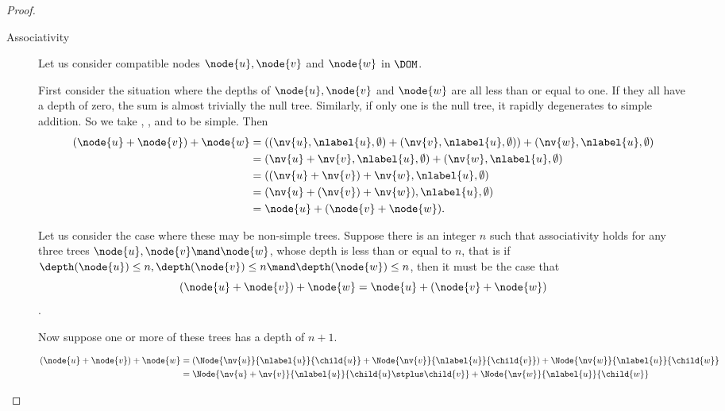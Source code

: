 \begin{proposition}
\begin{proof}
\begin{description}
    \item[Associativity]

      Let us consider compatible nodes \(\node{u}, \node{v}\) and
      \(\node{w}\) in $\DOM$. 

      First consider the situation where the depths of \(\node{u}, \node{v}\) and
      \(\node{w}\) are all less than or equal to one. If they all have
      a depth of zero, the sum is almost trivially the null
      tree. Similarly, if only one is the null tree, it rapidly
      degenerates to simple addition. So we take , ,
      and  to be simple. Then
      \begin{align*}
          (\node{u}+\node{v})+\node{w} &= ((\nv{u}, \nlabel{u}, \emptyset) + (\nv{v}, \nlabel{u}, \emptyset)) + (\nv{w}, \nlabel{u}, \emptyset) \\
          &= (\nv{u} + \nv{v}, \nlabel{u}, \emptyset) + (\nv{w}, \nlabel{u}, \emptyset) \\
          &= ((\nv{u} + \nv{v}) + \nv{w}, \nlabel{u}, \emptyset) \\
          &= (\nv{u} + (\nv{v}) + \nv{w}), \nlabel{u}, \emptyset) \\
          &= \node{u} + (\node{v} + \node{w}).
      \end{align*}
      
      Let us consider the case where these may be non-simple
      trees. Suppose there is an integer \(n\) such that associativity
      holds for any three trees \(\node{u}, \node{v} \mand \node{w}\),
      whose depth is less than or equal to \(n\), that is if
      \(\depth(\node{u}) \leq n, \depth(\node{v}) \leq n \mand
      \depth(\node{w}) \leq n\),
      then it must be the case that \[(\node{u} + \node{v}) + \node{w} = \node{u} + (\node{v} + \node{w})\].

      Now suppose one or more of these trees has a depth of
      \(n+1\).
      

      \begin{align*}
          (\node{u}+\node{v})+\node{w} &= (\Node{\nv{u}}{\nlabel{u}}{\child{u}} + \Node{\nv{v}}{\nlabel{u}}{\child{v}}) + \Node{\nv{w}}{\nlabel{u}}{\child{w}} \\
          &= \Node{\nv{u} + \nv{v}}{\nlabel{u}}{\child{u}\stplus\child{v}} + \Node{\nv{w}}{\nlabel{u}}{\child{w}}
      \end{align*}


\end{description}
\end{proof}
\end{proposition}
